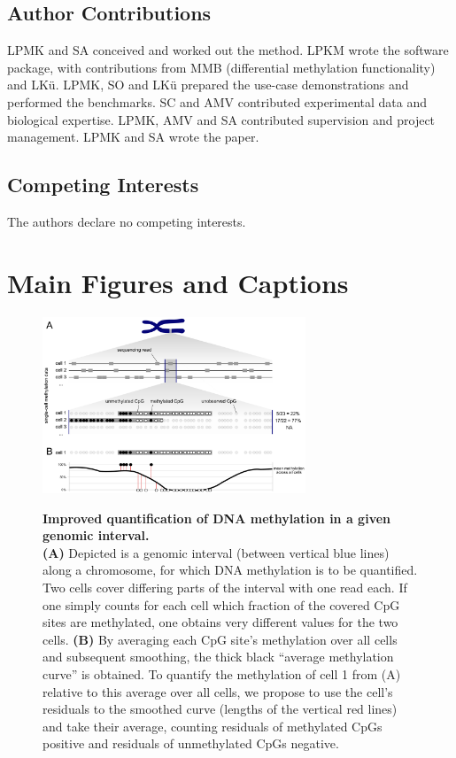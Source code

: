 \documentclass[10pt]{article}
\begin{document}
\subsection*{Author Contributions}

LPMK and SA conceived and worked out the method.
LPKM wrote the software package, with contributions from MMB (differential methylation functionality) and LKü.
LPMK, SO and LKü prepared the use-case demonstrations and performed the benchmarks.
SC and AMV contributed experimental data and biological expertise.
LPMK, AMV and SA contributed supervision and project management.
LPMK and SA wrote the paper.


\subsection*{Competing Interests}
The authors declare no competing interests.


\section*{Main Figures and Captions}

\begin{figure}[p]
	\begin{center}
		\includegraphics[width=0.7\textwidth]{figures/Fig_residuals_AB.pdf}\\
	\end{center}
	\caption{\small \textbf{Improved quantification of DNA methylation in a given genomic interval.}\\
		\textbf{(A)} Depicted is a genomic interval (between vertical blue lines) along a chromosome, for which DNA methylation is to be quantified.
		Two cells cover differing parts of the interval with one read each.
		If one simply counts for each cell which fraction of the covered CpG sites are methylated, one obtains very different values for the two cells.
		\textbf{(B)} By averaging each CpG site's methylation over all cells and subsequent smoothing, the thick black ``average methylation curve'' is obtained.
		To quantify the methylation of cell 1 from (A) relative to this average over all cells, we propose to use the cell's residuals to the smoothed curve (lengths of the vertical red lines) and take their average, counting residuals of methylated CpGs positive and residuals of unmethylated CpGs negative.}
	\label{fig:smoothres}
\end{figure}
\end{document}
